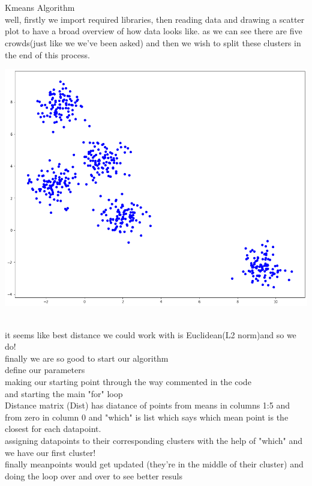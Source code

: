 \\\;
\\{\Large Kmeans Algorithm}
\\ well, firstly we import required libraries, then reading data and drawing a scatter plot to have a broad overview of how data looks like.
 as we can see there are five crowds(just like we we've been asked) and then we wish to split these clusters in the end of this process.

\begin{landscape}
\vspace*{0cm}
\hspace*{-0.5cm}\includegraphics[width = 1 \linewidth]{scatter.png}
\hspace*{2cm}
\end{landscape}
\\it seems like best distance we could work with is Euclidean(L2 norm)and so we do!
\\finally we are so good to start our algorithm 
\\\indent define our parameters
\\\indent making our starting point through the way commented in the code
\\\indent and starting the main "for" loop
\\ Distance matrix (Dist) has diatance of points from means in columns 1:5 and from zero in column 0 and "which" is list which says which mean point is the closest for each datapoint.
\\assigning datapoints to their corresponding clusters with the help of "which" and we have our first cluster!
\\finally meanpoints would get updated (they're in the middle of their cluster) and doing the loop over and over to see better resuls 

